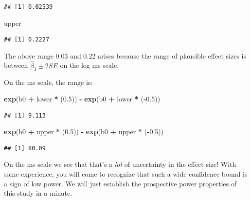 \documentclass[12pt,]{krantz}
\newenvironment{Shaded}{\begin{snugshade}}{\end{snugshade}}
\newcommand{\FloatTok}[1]{\textcolor[rgb]{0.00,0.00,0.81}{#1}}
\newcommand{\KeywordTok}[1]{\textcolor[rgb]{0.13,0.29,0.53}{\textbf{#1}}}
\newcommand{\NormalTok}[1]{#1}
\newcommand{\OperatorTok}[1]{\textcolor[rgb]{0.81,0.36,0.00}{\textbf{#1}}}
\newcommand{\StringTok}[1]{\textcolor[rgb]{0.31,0.60,0.02}{#1}}
\begin{document}
\begin{verbatim}
## [1] 0.02539
\end{verbatim}

\begin{Shaded}
\begin{Highlighting}[]
\NormalTok{upper}
\end{Highlighting}
\end{Shaded}

\begin{verbatim}
## [1] 0.2227
\end{verbatim}

The above range 0.03 and 0.22 arises because the range of plausible effect sizes is between \(\hat\beta_1 \pm 2SE\) on the log ms scale.

On the ms scale, the range is:

\begin{Shaded}
\begin{Highlighting}[]
\KeywordTok{exp}\NormalTok{(b0 }\OperatorTok{+}\StringTok{ }\NormalTok{lower }\OperatorTok{*}\StringTok{ }\NormalTok{(}\FloatTok{0.5}\NormalTok{)) }\OperatorTok{-}\StringTok{ }\KeywordTok{exp}\NormalTok{(b0 }\OperatorTok{+}\StringTok{ }\NormalTok{lower }\OperatorTok{*}\StringTok{ }\NormalTok{(}\OperatorTok{-}\FloatTok{0.5}\NormalTok{))}
\end{Highlighting}
\end{Shaded}

\begin{verbatim}
## [1] 9.113
\end{verbatim}

\begin{Shaded}
\begin{Highlighting}[]
\KeywordTok{exp}\NormalTok{(b0 }\OperatorTok{+}\StringTok{ }\NormalTok{upper }\OperatorTok{*}\StringTok{ }\NormalTok{(}\FloatTok{0.5}\NormalTok{)) }\OperatorTok{-}\StringTok{ }\KeywordTok{exp}\NormalTok{(b0 }\OperatorTok{+}\StringTok{ }\NormalTok{upper }\OperatorTok{*}\StringTok{ }\NormalTok{(}\OperatorTok{-}\FloatTok{0.5}\NormalTok{))}
\end{Highlighting}
\end{Shaded}

\begin{verbatim}
## [1] 80.09
\end{verbatim}

On the ms scale we see that that's a \emph{lot} of uncertainty in the effect size! With some experience, you will come to recognize that such a wide confidence bound is a sign of low power. We will just establish the prospective power properties of this study in a minute.
\end{document}
